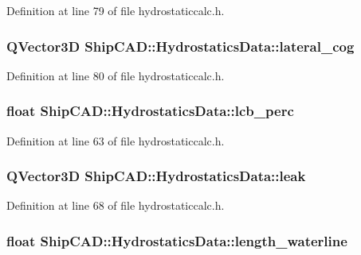 Definition at line 79 of file hydrostaticcalc.\-h.

\hypertarget{structShipCAD_1_1HydrostaticsData_adc0c4f2f0c5b110a968e45642dc5eeeb}{
\subsubsection[{lateral\-\_\-cog}]{\setlength{\rightskip}{0pt plus 5cm}Q\-Vector3\-D Ship\-C\-A\-D\-::\-Hydrostatics\-Data\-::lateral\-\_\-cog}}\label{structShipCAD_1_1HydrostaticsData_adc0c4f2f0c5b110a968e45642dc5eeeb}


Definition at line 80 of file hydrostaticcalc.\-h.

\hypertarget{structShipCAD_1_1HydrostaticsData_a783b71d811732bbc002b52f21d63c83a}{
\subsubsection[{lcb\-\_\-perc}]{\setlength{\rightskip}{0pt plus 5cm}float Ship\-C\-A\-D\-::\-Hydrostatics\-Data\-::lcb\-\_\-perc}}\label{structShipCAD_1_1HydrostaticsData_a783b71d811732bbc002b52f21d63c83a}


Definition at line 63 of file hydrostaticcalc.\-h.

\hypertarget{structShipCAD_1_1HydrostaticsData_a1132babc4274499418c2dc8ea6f86314}{
\subsubsection[{leak}]{\setlength{\rightskip}{0pt plus 5cm}Q\-Vector3\-D Ship\-C\-A\-D\-::\-Hydrostatics\-Data\-::leak}}\label{structShipCAD_1_1HydrostaticsData_a1132babc4274499418c2dc8ea6f86314}


Definition at line 68 of file hydrostaticcalc.\-h.

\hypertarget{structShipCAD_1_1HydrostaticsData_ae65aa54bcbfb059f11aa174cfaa0447b}{
\subsubsection[{length\-\_\-waterline}]{\setlength{\rightskip}{0pt plus 5cm}float Ship\-C\-A\-D\-::\-Hydrostatics\-Data\-::length\-\_\-waterline}}\label{structShipCAD_1_1HydrostaticsData_ae65aa54bcbfb059f11aa174cfaa0447b}



